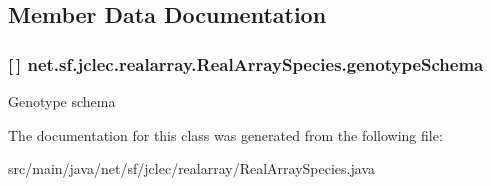 \subsection{Member Data Documentation}
\hypertarget{classnet_1_1sf_1_1jclec_1_1realarray_1_1_real_array_species_a97f34d721e8108eed41e9196ab9fdebf}{
\subsubsection[{genotype\-Schema}]{ \mbox{[}$\,$\mbox{]} net.\-sf.\-jclec.\-realarray.\-Real\-Array\-Species.\-genotype\-Schema\hspace{0.3cm}{\ttfamily [protected]}}}\label{classnet_1_1sf_1_1jclec_1_1realarray_1_1_real_array_species_a97f34d721e8108eed41e9196ab9fdebf}
Genotype schema 

The documentation for this class was generated from the following file\-:\begin{DoxyCompactItemize}
\item 
src/main/java/net/sf/jclec/realarray/Real\-Array\-Species.\-java\end{DoxyCompactItemize}
